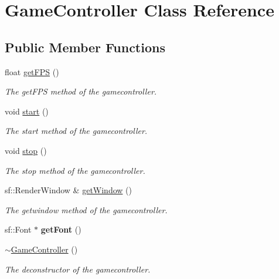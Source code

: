 \hypertarget{class_game_controller}{\section{Game\+Controller Class Reference}
\label{class_game_controller}
}
\subsection*{Public Member Functions}
\begin{DoxyCompactItemize}
\item 
float \hyperlink{class_game_controller_a54e8117f438fa872e5c1b24fd9469816}{get\+F\+P\+S} ()
\begin{DoxyCompactList}\small\item\em The get\+F\+P\+S method of the gamecontroller. \end{DoxyCompactList}\item 
void \hyperlink{class_game_controller_af365cd7a71dd76730a0bc92adc092103}{start} ()
\begin{DoxyCompactList}\small\item\em The start method of the gamecontroller. \end{DoxyCompactList}\item 
void \hyperlink{class_game_controller_a97872acdc39172c21e06665854656994}{stop} ()
\begin{DoxyCompactList}\small\item\em The stop method of the gamecontroller. \end{DoxyCompactList}\item 
sf\+::\+Render\+Window \& \hyperlink{class_game_controller_a993ad55478fff868c801ee7e6f4aaa2b}{get\+Window} ()
\begin{DoxyCompactList}\small\item\em The getwindow method of the gamecontroller. \end{DoxyCompactList}\item 
\hypertarget{class_game_controller_a305a4e04f9d2e6232a8a63fe1c6d317e}{sf\+::\+Font $\ast$ {\bfseries get\+Font} ()}\label{class_game_controller_a305a4e04f9d2e6232a8a63fe1c6d317e}

\item 
\hypertarget{class_game_controller_aab436961a422d078975bc7a49bdfcab7}{\hyperlink{class_game_controller_aab436961a422d078975bc7a49bdfcab7}{$\sim$\+Game\+Controller} ()}\label{class_game_controller_aab436961a422d078975bc7a49bdfcab7}

\begin{DoxyCompactList}\small\item\em The deconstructor of the gamecontroller. \end{DoxyCompactList}\end{DoxyCompactItemize}
